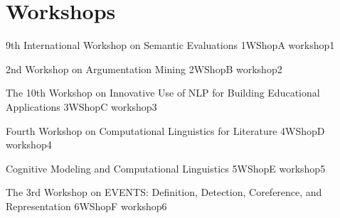 \chapter[Workshops: \daydate]{Workshops}
\thispagestyle{emptyheader}
\vfill




\clearpage
{}

\begin{wsschedule}
  {9th International Workshop on Semantic Evaluations}
  {1}{WShopA}
  {workshop1}
  {\WShopLocA}
  
\end{wsschedule}
        


\begin{wsschedule}
  {2nd Workshop on Argumentation Mining}
  {2}{WShopB}
  {workshop2}
  {\WShopLocB}
  
\end{wsschedule}

\begin{wsschedule}
  {The 10th Workshop on Innovative Use of NLP for Building Educational Applications}
  {3}{WShopC}
  {workshop3}
  {\WShopLocC}
  \clearpage
\end{wsschedule}

\begin{wsschedule}
  {Fourth Workshop on Computational Linguistics for Literature}
  {4}{WShopD}
  {workshop4}
  {\WShopLocD}
  
\end{wsschedule}

\begin{wsschedule}
  {Cognitive Modeling and Computational Linguistics}
  {5}{WShopE}
  {workshop5}
  {\WShopLocE}
  
\end{wsschedule}

\begin{wsschedule}
  {The 3rd Workshop on EVENTS: Definition, Detection, Coreference, and Representation}
  {6}{WShopF}
  {workshop6}
  {\WShopLocF}
  
\end{wsschedule}

